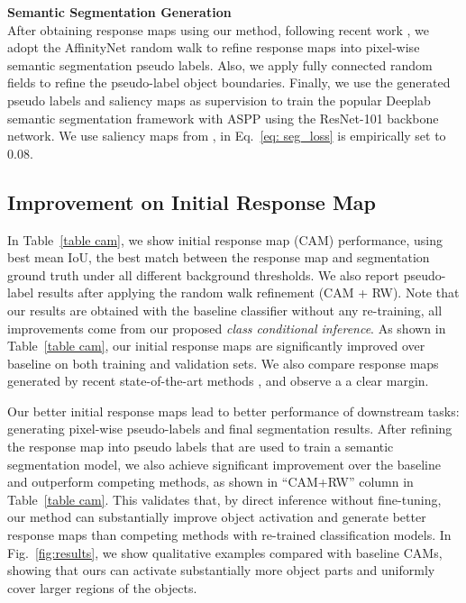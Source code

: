 \documentclass[10pt,twocolumn,letterpaper]{article}
\begin{document}
\noindent\textbf{Semantic Segmentation Generation}\\
After obtaining response maps using our method, following recent work \cite{wang2020self, chang2020weakly, chang2020mixup, sun2020mining, chen2020weakly}, 
we adopt the AffinityNet random walk \cite{ahn2018learning} to refine response maps into pixel-wise semantic segmentation pseudo labels.
Also, we apply fully connected random fields \cite{krahenbuhl2011efficient} to refine the pseudo-label object boundaries.
Finally, we use the generated pseudo labels and saliency maps as supervision to train the popular Deeplab semantic segmentation framework with ASPP \cite{chen2017deeplab} using the ResNet-101 backbone network. 
We use  saliency maps from \cite{jiang2019integral},  in Eq.~\ref{eq: seg_loss} is empirically set to 0.08.


\subsection{Improvement on Initial Response Map}
In Table~\ref{table cam}, we show initial response map (CAM) performance, using best mean IoU,
\ie the best match between the response map and segmentation ground truth under all different background thresholds.
We also report pseudo-label results 
after applying the random walk refinement (CAM + RW). 
Note
that our results are obtained with the baseline classifier without any re-training, all improvements come from our proposed \emph{class conditional inference}.
As shown in Table~\ref{table cam}, our initial response maps are significantly improved over baseline \cite{ahn2018learning} on both training and validation sets. We also compare
response maps generated by recent state-of-the-art methods \cite{chang2020mixup,chang2020weakly}, and observe a
a clear
margin. 

Our better initial response maps lead to better performance of downstream tasks: generating pixel-wise pseudo-labels and final segmentation results.
After refining the response map into  pseudo labels that are used to train a semantic segmentation model,  
we also achieve significant improvement over the baseline and outperform competing methods, as shown in \enquote{CAM+RW} 
column in Table~\ref{table cam}.
This validates that, by direct inference without fine-tuning, our method can substantially improve object activation and generate better response maps than competing methods with re-trained classification models.
In Fig.~\ref{fig:results}, we show qualitative examples compared with baseline CAMs, showing that ours can activate substantially more object parts and
uniformly cover larger regions of the objects.
\end{document}
